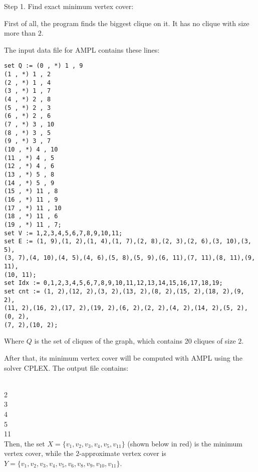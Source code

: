 \documentclass{beamer}
\begin{document}
{\begin{defi}
\begin{center}
\end{center}

\vspace{1cm}

Step 1. Find exact minimum vertex cover:

First of all, the program finds the biggest clique on it. It has no clique with size more than $2$.

The input data file for AMPL contains these lines:
\newpage
{\small 
\begin{verbatim}
set Q := (0 , *) 1 , 9
(1 , *) 1 , 2
(2 , *) 1 , 4
(3 , *) 1 , 7
(4 , *) 2 , 8
(5 , *) 2 , 3
(6 , *) 2 , 6
(7 , *) 3 , 10
(8 , *) 3 , 5
(9 , *) 3 , 7
(10 , *) 4 , 10
(11 , *) 4 , 5
(12 , *) 4 , 6
(13 , *) 5 , 8
(14 , *) 5 , 9
(15 , *) 11 , 8
(16 , *) 11 , 9
(17 , *) 11 , 10
(18 , *) 11 , 6
(19 , *) 11 , 7;
set V := 1,2,3,4,5,6,7,8,9,10,11;
set E := (1, 9),(1, 2),(1, 4),(1, 7),(2, 8),(2, 3),(2, 6),(3, 10),(3, 5),
(3, 7),(4, 10),(4, 5),(4, 6),(5, 8),(5, 9),(6, 11),(7, 11),(8, 11),(9, 11),
(10, 11);
set Idx := 0,1,2,3,4,5,6,7,8,9,10,11,12,13,14,15,16,17,18,19;
set cnt := (1, 2),(12, 2),(3, 2),(13, 2),(8, 2),(15, 2),(18, 2),(9, 2),
(11, 2),(16, 2),(17, 2),(19, 2),(6, 2),(2, 2),(4, 2),(14, 2),(5, 2),(0, 2),
(7, 2),(10, 2);
\end{verbatim}
}
Where $Q$ is the set of cliques of the graph, which contains 20 cliques of size $2$.

After that, its minimum vertex cover will be computed with AMPL using the solver CPLEX. The output file contains:

 \\
2 \\
3 \\
4 \\
5 \\
11 \\

Then, the set $X = \{v_1 , v_2 , v_3 , v_4 , v_5 , v_{11}\}$  (shown below in red) is the minimum vertex cover, while the $2$-approximate vertex cover is $Y = \{v_1 , v_2 , v_3 , v_4 , v_5 , v_6 , v_8 , v_9 , v_{10} , v_{11}\}$.

\vspace{1cm}


\end{defi}}
\end{document}
